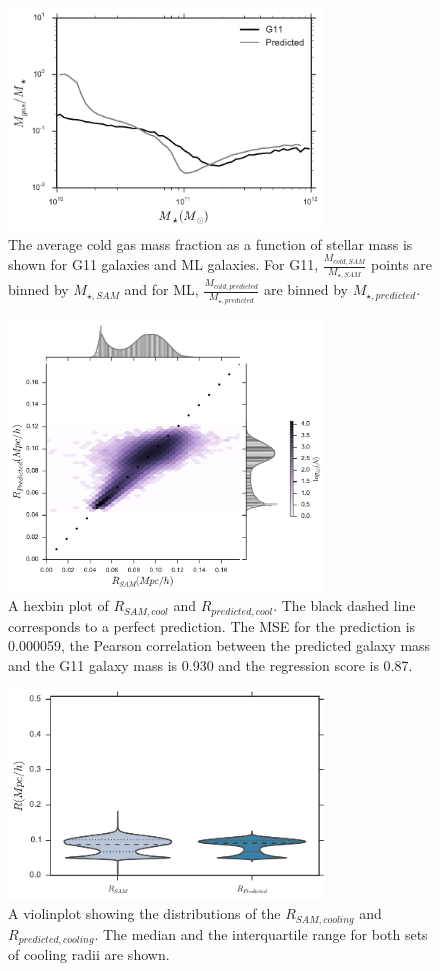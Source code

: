 \documentclass[a4paper,fleqn,usenatbib]{mnras}
\begin{document}
\begin{figure}
\includegraphics[width=84mm]{fig13.pdf}
\caption{The average cold gas mass fraction as a function of stellar mass is shown for G11 galaxies and ML galaxies. For G11, $\frac{M_{cold,SAM}}{M_{\star,SAM}}$ points are binned by $M_{\star,SAM}$ and for ML, $\frac{M_{cold,predicted}}{M_{\star,predicted}}$ are binned by $M_{\star,predicted}$. }
\label{gasfrac}

\end{figure}

\begin{figure}
  \includegraphics[width=84mm]{fig14.pdf}
  \caption{A hexbin plot of $R_{SAM,cool}$ and $R_{predicted,cool}$. The black dashed line corresponds to a perfect prediction. The MSE for the prediction is 0.000059, the Pearson correlation between the predicted galaxy mass and the G11 galaxy mass is 0.930 and the regression score is 0.87.}
    \label{radius1}

\end{figure}


\begin{figure}
  \includegraphics[width=84mm]{fig15.pdf}
  \caption{A violinplot showing the distributions of the $R_{SAM,cooling}$ and $R_{predicted,cooling}$. The median and the interquartile range for both sets of cooling radii are shown.}
    \label{radius2}

\end{figure}
\end{document}
